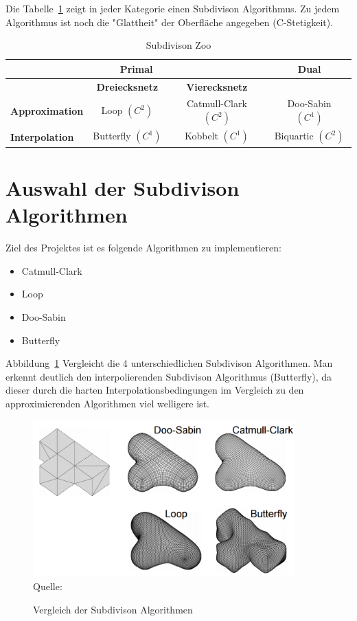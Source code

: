 Die Tabelle~\ref{tab:sd_comp} zeigt in jeder Kategorie einen Subdivison Algorithmus.
Zu jedem Algorithmus ist noch die "Glattheit" der Oberfläche angegeben (C-Stetigkeit).
\begin{table}[h]
\caption{Subdivison Zoo}
\center
\begin{tabular}{l|c|c|c}
\toprule
\multicolumn{3}{c|}{\textbf{Primal}} & \textbf{Dual}\\
\midrule
& \textbf{Dreiecksnetz} & \textbf{Vierecksnetz} & \\
\midrule
\textbf{Approximation} & Loop \((C^2)\) & Catmull-Clark \((C^2)\) & Doo-Sabin \((C^1)\) \\
\textbf{Interpolation} & Butterfly \((C^1)\) & Kobbelt \((C^1)\) & Biquartic \((C^2)\) \\
\bottomrule
\end{tabular}
\label{tab:sd_comp}
\end{table}


\section{Auswahl der Subdivison Algorithmen}

Ziel des Projektes ist es folgende Algorithmen zu implementieren:
\begin{itemize}
	\item Catmull-Clark
	\item Loop
	\item Doo-Sabin
	\item Butterfly
\end{itemize}

Abbildung~\ref{fig:sd_comp} Vergleicht die 4 unterschiedlichen Subdivison Algorithmen.
Man erkennt deutlich den interpolierenden Subdivison Algorithmus (Butterfly),
da dieser durch die harten Interpolationsbedingungen im Vergleich zu den approximierenden Algorithmen viel welligere ist.
\begin{figure}[h]
  \caption{Vergleich der Subdivison Algorithmen}
  \centering
  \includegraphics[width=0.9\textwidth]{content/media/sd_overview.png}
  \\Quelle: \cite{Standford.24.07.2015}
  \label{fig:sd_comp}
\end{figure}
